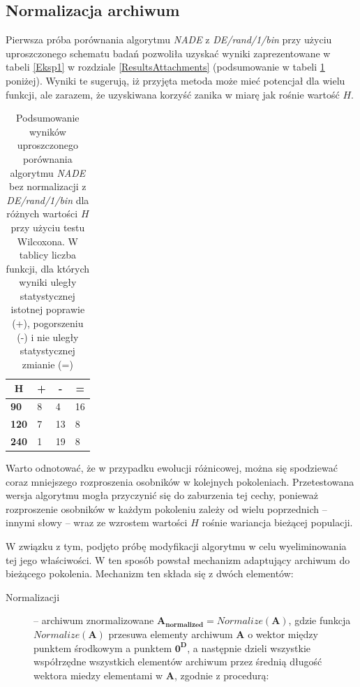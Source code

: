 \documentclass[12pt,a4paper]{report}
\begin{document}
{{{{{{\subsection{Normalizacja archiwum}
\par{
Pierwsza próba porównania algorytmu \emph{NADE} z \emph{DE/rand/1/bin} przy użyciu uproszczonego schematu badań pozwoliła uzyskać wyniki zaprezentowane w tabeli \ref{Eksp1} w rozdziale \ref{ResultsAttachments} (podsumowanie w tabeli \ref{Eksp1short} poniżej). Wyniki te sugerują, iż przyjęta metoda może mieć potencjał dla wielu funkcji, ale zarazem, że uzyskiwana korzyść zanika w miarę jak rośnie wartość $H$.
}
\begin{table}[h]
\centering
\caption{Podsumowanie wyników uproszczonego porównania algorytmu \emph{NADE} bez normalizacji z \emph{DE/rand/1/bin} dla różnych wartości $H$ przy użyciu testu Wilcoxona. W tablicy liczba funkcji, dla których wyniki uległy statystycznej istotnej poprawie (+), pogorszeniu (-) i nie uległy statystycznej zmianie (=)}
\label{Eksp1short}
\begin{tabular}{|l|l|l|l|}
\hline
\multicolumn{1}{|c|}{{\bf H}} & \multicolumn{1}{c|}{{\bf +}} & \multicolumn{1}{c|}{{\bf -}} & \multicolumn{1}{c|}{{\bf =}} \\ \hline
{\bf 90}  & 8 & 4  & 16 \\ \hline
{\bf 120} & 7 & 13 & 8  \\ \hline
{\bf 240} & 1 & 19 & 8  \\ \hline
\end{tabular}
\end{table}
\par{
Warto odnotować, że w przypadku ewolucji różnicowej, można się spodziewać coraz mniejszego rozproszenia osobników w kolejnych pokoleniach. Przetestowana wersja algorytmu mogła przyczynić się do zaburzenia tej cechy, ponieważ rozproszenie osobników w każdym pokoleniu zależy od wielu poprzednich -- innymi słowy -- wraz ze wzrostem wartości $H$ rośnie wariancja bieżącej populacji.
}
\par{
W związku z tym, podjęto próbę modyfikacji algorytmu w celu wyeliminowania tej jego właściwości. W ten sposób powstał mechanizm adaptujący archiwum do bieżącego pokolenia. Mechanizm ten składa się z dwóch elementów:
\begin{description}
\item[Normalizacji] -- archiwum znormalizowane $\mathbf{A_{normalized}} = Normalize(\mathbf{A})$, gdzie funkcja $Normalize(\mathbf{A})$ przesuwa elementy archiwum $\mathbf{A}$ o wektor między punktem środkowym a punktem $\mathbf{0^D}$, a następnie dzieli wszystkie współrzędne wszystkich elementów archiwum przez średnią długość wektora miedzy elementami w $\mathbf{A}$, zgodnie z procedurą:


\end{description}}}}}}}}
\end{document}
